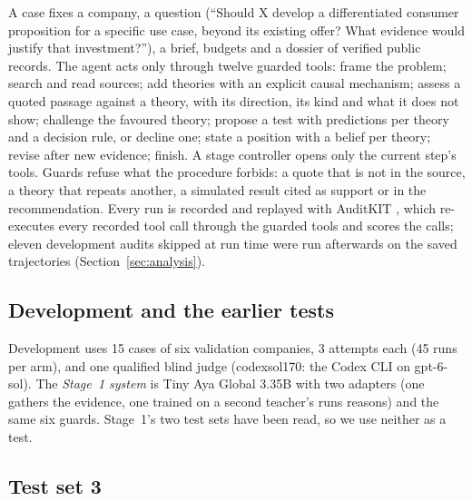 \documentclass[11pt]{article}
\begin{document}
A case fixes a company, a question (``Should X develop a differentiated consumer proposition for a specific use case,
beyond its existing offer? What evidence would justify that investment?''), a brief, budgets and a dossier of
verified public records. The agent acts only through twelve guarded tools: frame the problem; search and read
sources; add theories with an explicit causal mechanism; assess a quoted passage against a theory, with its direction,
its kind and what it does not show; challenge the favoured theory; propose a test with predictions per theory and a
decision rule, or decline one; state a position with a belief per theory; revise after new evidence; finish. A stage
controller opens only the current step's tools. Guards refuse what the procedure forbids: a quote that is not in the
source, a theory that repeats another, a simulated result cited as support or in the recommendation. Every run is
recorded and replayed with AuditKIT \citep{lexsi_auditkit}, which re-executes every recorded tool call through the
guarded tools and scores the calls; eleven development audits skipped at run time were run afterwards on the saved
trajectories (Section~\ref{sec:analysis}).

\subsection{Development and the earlier tests}

Development uses 15 cases of six validation companies, 3 attempts each (45 runs per arm), and one qualified blind
judge (codexsol170: the Codex CLI on gpt-6-sol). The \emph{Stage~1 system} is Tiny Aya Global 3.35B with two
adapters (one gathers the evidence, one trained on a second teacher's runs reasons) and the same six guards. Stage~1's two test sets have been read, so we use neither as a test.

\subsection{Test set 3}
\label{sec:test3}
\end{document}

